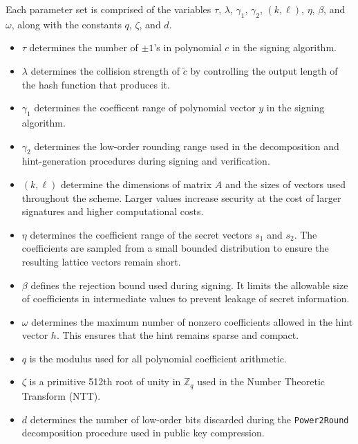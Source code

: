 \documentclass[runningheads]{llncs}
\begin{document}
Each parameter set is comprised of the variables $\tau$, $\lambda$, $\gamma_1$, $\gamma_2$, $(k, \ell)$, $\eta$, $\beta$, and $\omega$, along with the constants $q$, $\zeta$, and $d$.
\begin{itemize}
\item $\tau$ determines the number of $\pm1$'s in polynomial $c$ in the signing algorithm.
\item $\lambda$ determines the collision strength of $\tilde{c}$ by controlling the output length of the hash function that produces it.
\item $\gamma_1$ determines the coefficent range of polynomial vector $y$ in the signing algorithm. 
\item $\gamma_2$ determines the low-order rounding range used in the decomposition and hint-generation procedures during signing and verification.
\item $(k,\ell)$ determine the dimensions of matrix $A$ and the sizes of vectors used throughout the scheme. Larger values increase security at the cost of larger signatures and higher computational costs.
\item $\eta$ determines the coefficient range of the secret vectors $s_1$ and $s_2$. The coefficients are sampled from a small bounded distribution to ensure the resulting lattice vectors remain short.
\item $\beta$ defines the rejection bound used during signing. It limits the allowable size of coefficients in intermediate values to prevent leakage of secret information.
\item $\omega$ determines the maximum number of nonzero coefficients allowed in the hint vector $h$. This ensures that the hint remains sparse and compact.
\item $q$ is the modulus used for all polynomial coefficient arithmetic.
\item $\zeta$ is a primitive 512th root of unity in $\mathbb{Z}_q$ used in the Number Theoretic Transform (NTT).
\item $d$ determines the number of low-order bits discarded during the \texttt{Power2Round} decomposition procedure used in public key compression.
\end{itemize}
\end{document}
